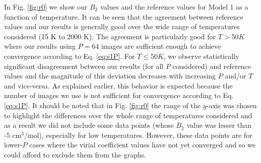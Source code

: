                 In Fig. \ref{fig:r0} we show our $B_2$ values and the reference values for Model 1 as a function of temperature. It can be seen that the agreement between reference values and our results is generally good over the wide range of temperatures considered (15 K to 2000 K). The agreement is particularly good for $T > 50 K$ where our results using $P = 64$ images are sufficient enough to achieve convergence according to Eq. \eqref{eq:s1P}. For $T \le 50 K$, we observe statistically significant disagreement between our results (for all $P$ considered) and reference values and the magnitude of this deviation decreases with increasing $P$ and/or $T$ and vice-versa. As explained earlier, this behavior is expected because the number of images we use is not sufficient for convergence according to Eq. \eqref{eq:s1P}. It should be noted that in Fig. \ref{fig:r0} the range of the $y$-axis was chosen to highlight the differences over the whole range of temperatures considered and as a result we did not include some data points (whose $B_2$ value was lesser than -5 cm$^3$/mol), especially for low temperatures. However, these data points are for lower-$P$ cases where the virial coefficient values have not yet converged and so we could afford to exclude them from the graphs.
                
